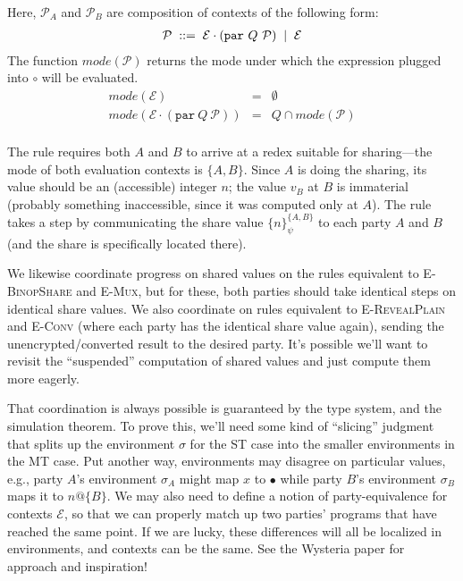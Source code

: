\documentclass[10pt]{article}
\makeatletter
\newcommand{\rulelab}[1]{{\small \textsc{#1}}}
\newcommand{\kw}[1]{\ensuremath{\mathtt{#1}}}
\newcommand{\epar}[2]{\ensuremath{\kw{par}~{#1}~{#2}}}
\newcommand{\vshare}[3]{\ensuremath{\{{#3}\}^{#1}_{#2}}}
\newcommand{\vloc}[2]{\ensuremath{{#1}\kw{@}{#2}}}
\newcommand{\vcrash}{\ensuremath{\bullet}}
\newcommand{\env}{\ensuremath{\sigma}}
\newcommand{\ctxt}{\ensuremath{\mathcal{E}}}
\newcommand{\pctxt}{\ensuremath{\mathcal{P}}}
\newcommand{\hole}{\ensuremath{\circ}}
\makeatother
\begin{document}
Here, $\pctxt_A$ and $\pctxt_B$ are composition of contexts
of the following form:
$$
\begin{array}{lcl}
  \multicolumn{3}{l}{\pctxt \; ::= \; \ctxt \cdot (\epar{Q}{\pctxt})\;
  \mid\; \ctxt}\\
\end{array}
$$
The function $\mathit{mode}(\pctxt)$ returns the mode under which the
expression plugged into $\hole$ will be evaluated.
$$
\begin{array}{lcl}
  \mathit{mode}(\ctxt) & = & \emptyset\\
  \mathit{mode}(\ctxt \cdot (\epar{Q}{\pctxt})) & = & Q \cap \mathit{mode}(\pctxt)\\
\end{array}
$$

The rule requires both $A$ and $B$ to arrive at a redex suitable
for sharing---the mode of both evaluation contexts is
$\{A,B\}$. Since $A$ is doing the sharing, its value should be an
(accessible) integer $n$; the value $v_B$ at $B$ is immaterial
(probably something inaccessible, since it was computed only at $A$).
The rule takes a step by communicating the share
value $\vshare{\{A,B\}}{\psi}{n}$ to each party $A$ and $B$ (and the
share is specifically located there).

We likewise coordinate progress on shared values on the rules
equivalent to \rulelab{E-BinopShare} and \rulelab{E-Mux}, but for
these, both parties should take identical steps on identical share
values. We also coordinate on rules equivalent to
\rulelab{E-RevealPlain} and \rulelab{E-Conv}
(where each party has the identical share value again), sending the
unencrypted/converted result to the desired party. It's possible we'll want to
revisit the ``suspended'' computation of shared values and just
compute them more eagerly.

That coordination is always possible is guaranteed by the type system,
and the simulation theorem. To prove this, we'll need some kind of
``slicing'' judgment that splits up the environment $\env$ for the ST
case into the smaller environments in the MT case. Put another way,
environments may disagree on particular values, e.g., party $A$'s
environment $\env_A$ might map $x$ to $\vcrash$ while party $B$'s
environment $\env_B$ maps it to $\vloc{n}{\{B\}}$. We may also need to
define a notion of party-equivalence for contexts $\ctxt$, so that we
can properly match up two parties' programs that have reached the same
point. If we are lucky, these differences will all be localized in
environments, and contexts can be the same. See the Wysteria paper for
approach and inspiration!
\end{document}
